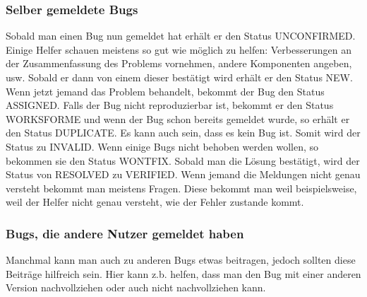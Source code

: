 \subsubsection{Selber gemeldete Bugs}
Sobald man einen Bug nun gemeldet hat erhält er den Status UNCONFIRMED. Einige Helfer schauen meistens so gut wie möglich zu helfen: Verbesserungen an der Zusammenfassung des Problems vornehmen, andere Komponenten angeben, usw.
Sobald er dann von einem dieser bestätigt wird erhält er den Status NEW. Wenn jetzt jemand das Problem behandelt, bekommt der Bug den Status ASSIGNED. Falls der Bug nicht reproduzierbar ist, bekommt er den Status WORKSFORME und wenn der Bug schon bereits gemeldet wurde, so erhält er den Status DUPLICATE. Es kann auch sein, dass es kein Bug ist. Somit wird der Status zu INVALID. Wenn einige Bugs nicht behoben werden wollen, so bekommen sie den Status WONTFIX. Sobald man die Lösung bestätigt, wird der Status von RESOLVED zu VERIFIED.
Wenn jemand die Meldungen nicht genau versteht bekommt man meistens Fragen. Diese bekommt man weil beispielsweise, weil der Helfer nicht genau versteht, wie der Fehler zustande kommt.

\subsubsection{Bugs, die andere Nutzer gemeldet haben}
Manchmal kann man auch zu anderen Bugs etwas beitragen, jedoch sollten diese Beiträge hilfreich sein. Hier kann z.b. helfen, dass man den Bug mit einer anderen Version nachvollziehen oder auch nicht nachvollziehen kann.
